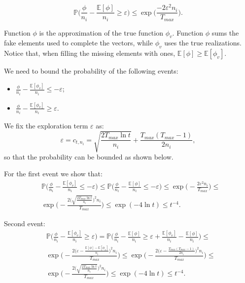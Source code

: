 \[ \mathbb{P}\bigg(\frac{\phi}{n_i}-\frac{\mathbb{E}[\phi]}{n_i}\ge\varepsilon\bigg) \le  \exp\Bigg({\frac{-2\varepsilon^2 n_i}{T_{max}}}\Bigg).
\]

Function $\phi$ is the approximation of the true function $\phi_v$. Function $\phi$ sums the fake elements used to complete the vectors, while $\phi_v$ uses the true realizations. Notice that, when filling the missing elements with ones, $\mathbb{E}[\phi]\ge\mathbb{E}[\phi_v]$.

We need to bound the probability of the following events:
\begin{itemize}
	\item $\frac{\phi}{n_i}-\frac{\mathbb{E}[\phi_v]}{n_i}\le -\varepsilon$;
	\item $\frac{\phi}{n_i}-\frac{\mathbb{E}[\phi_v]}{n_i}\ge \varepsilon$.
\end{itemize}

We fix the exploration term $\varepsilon$ as: 
\[\varepsilon = c_{t,n_i}=\sqrt{\frac{2 T_{max}\ln t }{n_i}} + \frac{T_{max}(T_{max}-1)}{2n_i},\]
so that the probability can be bounded as shown below.

For the first event we show that:
\begin{align}
	&\mathbb{P}\Bigg(\frac{\phi}{n_i}-\frac{\mathbb{E}[\phi_v]}{n_i}\le -\varepsilon\Bigg) \le \mathbb{P}\Bigg(\frac{\phi}{n_i}-\frac{\mathbb{E}[\phi]}{n_i}\le -\varepsilon\Bigg) \le \exp \bigg(-\frac{2 \varepsilon^2 n_i}{T_{max}}\bigg) \le\\
	& \exp \Bigg(-\frac{2 \Big(\sqrt{\frac{2 T_{max}\ln t }{n_i}}\Big)^2 n_i}{T_{max}}\Bigg) \le \exp (-4 \ln t) \le t^{-4}.
\end{align}

Second event:
\begin{align}
	&\mathbb{P}\Bigg(\frac{\phi}{n_i}-\frac{\mathbb{E}[\phi_v]}{n_i}\ge \varepsilon\Bigg) = \mathbb{P}\Bigg(\frac{\phi}{n_i}-\frac{\mathbb{E}[\phi]}{n_i}\ge \varepsilon+\frac{\mathbb{E}[\phi_v]}{n_i}-\frac{\mathbb{E}[\phi]}{n_i}\Bigg) \le \\
	&\exp \Bigg(-\frac{2 \big(\varepsilon-\frac{\mathbb{E}[\phi]-\mathbb{E}[\phi_v]}{n_i}\big)^2 n_i}{T_{max}}\Bigg) \le \exp \Bigg(-\frac{2 \big(\varepsilon-\frac{T_{max}(T_{max}-1)}{2n_i}\big)^2 n_i}{T_{max}}\Bigg) \label{maxdif} \le \\
	& \exp \Bigg(-\frac{2 \Big(\sqrt{\frac{2 T_{max}\ln t }{n_i}}\Big)^2 n_i}{T_{max}}\Bigg) \le \exp (-4 \ln t) \le t^{-4}.
\end{align}

